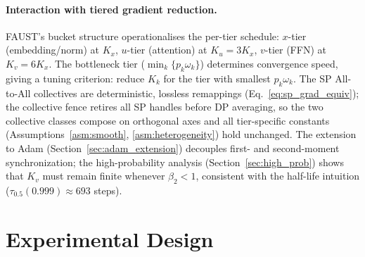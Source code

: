 \documentclass{article}
\begin{document}
\paragraph{Interaction with tiered gradient reduction.}
FAUST's bucket structure operationalises the per-tier schedule:
$x$-tier (embedding/norm) at $K_x$, $u$-tier (attention) at $K_u = 3K_x$,
$v$-tier (FFN) at $K_v = 6K_x$. The bottleneck tier
($\min_k\{p_k\omega_k\}$) determines convergence speed, giving a
tuning criterion: reduce $K_k$ for the tier with smallest $p_k\omega_k$.
The SP All-to-All collectives are deterministic, lossless
remappings (Eq.~\eqref{eq:sp_grad_equiv}); the collective fence
retires all SP handles before DP averaging, so the two collective
classes compose on orthogonal axes and all tier-specific constants
(Assumptions~\ref{asm:smooth}, \ref{asm:heterogeneity}) hold unchanged.
The extension to Adam (Section~\ref{sec:adam_extension}) decouples
first- and second-moment synchronization; the high-probability analysis
(Section~\ref{sec:high_prob}) shows that $K_v$ must remain finite
whenever $\beta_2 < 1$, consistent with the half-life intuition
($\tau_{0.5}(0.999) \approx 693$ steps).

\section{Experimental Design}
\label{sec:experimental_design}


\end{document}
